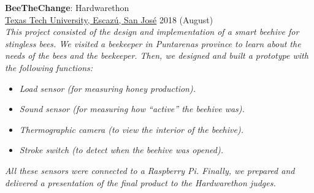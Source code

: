 \begin{tcolorbox}[title=Projects \faLightbulb,colframe=blue!25!black]
        \textbf{BeeTheChange}: Hardwarethon \\
        \faMapMarker \hspace{0mm} \href{https://www.depts.ttu.edu/costarica/}{Texas Tech University, Escazú, San José} \hspace{8.4cm} \faCalendar \hspace{0mm} 2018 (August)\\
        \textit{This project consisted of the design and implementation of a smart beehive for stingless bees. We visited a beekeeper in Puntarenas province to learn about the needs of the bees and the beekeeper. Then, we designed and built a prototype with the following functions:}
        \begin{itemize}
            \item \textit{Load sensor (for measuring honey production).}
            \item \textit{Sound sensor (for measuring how “active” the beehive was).}
            \item \textit{Thermographic camera (to view the interior of the beehive).}
            \item \textit{Stroke switch (to detect when the beehive was opened).}
        \end{itemize}
         
        \textit{All these sensors were connected to a Raspberry Pi. Finally, we prepared and delivered a presentation of the final product to the Hardwarethon judges.}

    \end{tcolorbox}
    